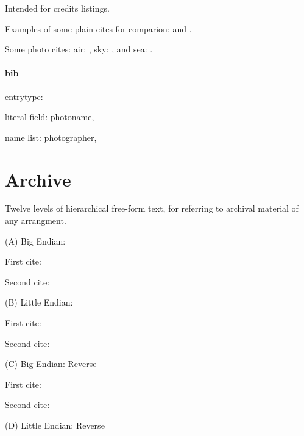 Intended for credits listings.

Examples of some plain cites for comparion: 
\cite{kastenholz} 
and
\cite{vangennep}.

\medskip
{}

Some photo cites: air: , sky: , and sea: . 


\paragraph{bib}

entrytype: 

literal field: photoname,

name list: photographer,

\ddivider



\section{Archive}

Twelve levels of hierarchical free-form text, for referring to archival material of any arrangment.


\medskip
(A) Big Endian:
 
\togglefalse{littleendian}

\noindent First cite: 

Second cite: 

\medskip
(B) Little Endian:
\toggletrue{littleendian}

\citetrackerfalse
\noindent First cite: 

\citetrackertrue
Second cite: 


\bigskip
{}

\medskip
(C) Big Endian: Reverse
 
\togglefalse{littleendian}

\citetrackerfalse
\noindent First cite: 

\citetrackertrue
Second cite: 

\medskip
(D) Little Endian: Reverse
\toggletrue{littleendian}

